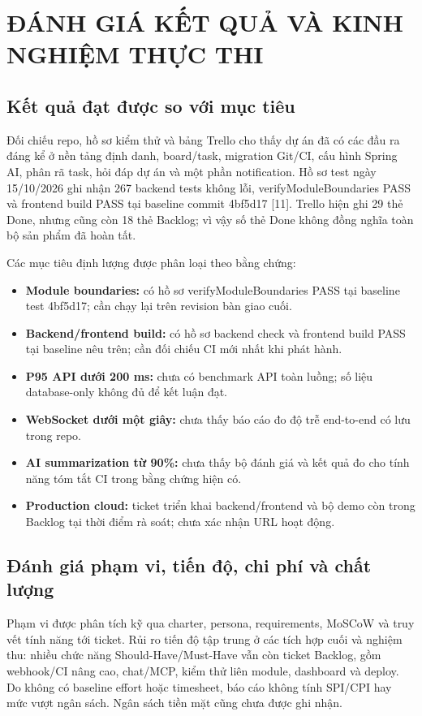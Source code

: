 \documentclass[12pt,a4paper]{report}
\begin{document}
\chapter{ĐÁNH GIÁ KẾT QUẢ VÀ KINH NGHIỆM THỰC THI}
\section{Kết quả đạt được so với mục tiêu}
Đối chiếu repo, hồ sơ kiểm thử và bảng Trello cho thấy dự án đã có các đầu ra đáng kể ở nền tảng định danh, board/task, migration Git/CI, cấu hình Spring AI, phân rã task, hỏi đáp dự án và một phần notification. Hồ sơ test ngày 15/10/2026 ghi nhận 267 backend tests không lỗi, verifyModuleBoundaries PASS và frontend build PASS tại baseline commit 4bf5d17 [11]. Trello hiện ghi 29 thẻ Done, nhưng cũng còn 18 thẻ Backlog; vì vậy số thẻ Done không đồng nghĩa toàn bộ sản phẩm đã hoàn tất.

Các mục tiêu định lượng được phân loại theo bằng chứng:
\begin{itemize}
    \item \textbf{Module boundaries:} có hồ sơ verifyModuleBoundaries PASS tại baseline test 4bf5d17; cần chạy lại trên revision bàn giao cuối.
    \item \textbf{Backend/frontend build:} có hồ sơ backend check và frontend build PASS tại baseline nêu trên; cần đối chiếu CI mới nhất khi phát hành.
    \item \textbf{P95 API dưới 200 ms:} chưa có benchmark API toàn luồng; số liệu database-only không đủ để kết luận đạt.
    \item \textbf{WebSocket dưới một giây:} chưa thấy báo cáo đo độ trễ end-to-end có lưu trong repo.
    \item \textbf{AI summarization từ 90\%:} chưa thấy bộ đánh giá và kết quả đo cho tính năng tóm tắt CI trong bằng chứng hiện có.
    \item \textbf{Production cloud:} ticket triển khai backend/frontend và bộ demo còn trong Backlog tại thời điểm rà soát; chưa xác nhận URL hoạt động.
\end{itemize}

\section{Đánh giá phạm vi, tiến độ, chi phí và chất lượng}
Phạm vi được phân tích kỹ qua charter, persona, requirements, MoSCoW và truy vết tính năng tới ticket. Rủi ro tiến độ tập trung ở các tích hợp cuối và nghiệm thu: nhiều chức năng Should-Have/Must-Have vẫn còn ticket Backlog, gồm webhook/CI nâng cao, chat/MCP, kiểm thử liên module, dashboard và deploy. Do không có baseline effort hoặc timesheet, báo cáo không tính SPI/CPI hay mức vượt ngân sách. Ngân sách tiền mặt cũng chưa được ghi nhận.
\end{document}
